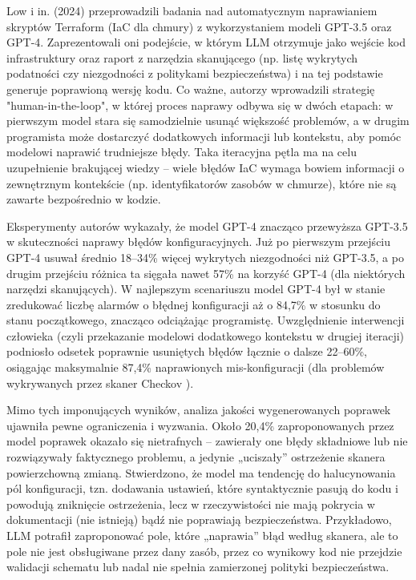 Low i in. (2024) \cite{low_repairing_2024} przeprowadzili badania nad automatycznym naprawianiem skryptów Terraform (IaC dla chmury) z wykorzystaniem modeli GPT-3.5 oraz GPT-4. Zaprezentowali oni podejście, w którym LLM otrzymuje jako wejście kod infrastruktury oraz raport z narzędzia skanującego (np. listę wykrytych podatności czy niezgodności z politykami bezpieczeństwa) i na tej podstawie generuje poprawioną wersję kodu. Co ważne, autorzy wprowadzili strategię "human-in-the-loop", w której proces naprawy odbywa się w dwóch etapach: w pierwszym model stara się samodzielnie usunąć większość problemów, a w drugim programista może dostarczyć dodatkowych informacji lub kontekstu, aby pomóc modelowi naprawić trudniejsze błędy. Taka iteracyjna pętla ma na celu uzupełnienie brakującej wiedzy – wiele błędów IaC wymaga bowiem informacji o zewnętrznym kontekście (np. identyfikatorów zasobów w chmurze), które nie są zawarte bezpośrednio w kodzie.

Eksperymenty autorów wykazały, że model GPT-4 znacząco przewyższa GPT-3.5 w skuteczności naprawy błędów konfiguracyjnych. Już po pierwszym przejściu GPT-4 usuwał średnio 18–34\% więcej wykrytych niezgodności niż GPT-3.5, a po drugim przejściu różnica ta sięgała nawet 57\% na korzyść GPT-4 (dla niektórych narzędzi skanujących). W najlepszym scenariuszu model GPT-4 był w stanie zredukować liczbę alarmów o błędnej konfiguracji aż o 84,7\% w stosunku do stanu początkowego, znacząco odciążając programistę. Uwzględnienie interwencji człowieka (czyli przekazanie modelowi dodatkowego kontekstu w drugiej iteracji) podniosło odsetek poprawnie usuniętych błędów łącznie o dalsze 22–60\%, osiągając maksymalnie 87,4\% naprawionych mis-konfiguracji (dla problemów wykrywanych przez skaner Checkov \cite{checkov}).

Mimo tych imponujących wyników, analiza jakości wygenerowanych poprawek ujawniła pewne ograniczenia i wyzwania. Około 20,4\% zaproponowanych przez model poprawek okazało się nietrafnych – zawierały one błędy składniowe lub nie rozwiązywały faktycznego problemu, a jedynie „uciszały” ostrzeżenie skanera powierzchowną zmianą. Stwierdzono, że model ma tendencję do halucynowania pól konfiguracji, tzn. dodawania ustawień, które syntaktycznie pasują do kodu i powodują zniknięcie ostrzeżenia, lecz w rzeczywistości nie mają pokrycia w dokumentacji (nie istnieją) bądź nie poprawiają bezpieczeństwa. Przykładowo, LLM potrafił zaproponować pole, które „naprawia” błąd według skanera, ale to pole nie jest obsługiwane przez dany zasób, przez co wynikowy kod nie przejdzie walidacji schematu lub nadal nie spełnia zamierzonej polityki bezpieczeństwa.

